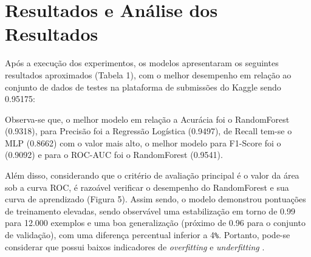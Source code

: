 \documentclass[conference]{IEEEtran}
\begin{document}

\section{Resultados e Análise dos Resultados}
Após a execução dos experimentos, os modelos apresentaram os seguintes resultados aproximados (Tabela 1), com o melhor desempenho em relação ao conjunto de dados de testes na plataforma de submissões do Kaggle sendo 0.95175:

\bigskip

\begin{table}[ht]
\centering
{}
\caption{Métricas de Desempenho por Modelo}
\label{tab:metricas}
\end{table}

\bigskip

\noindent
Observa-se que, o melhor modelo em relação a Acurácia foi o RandomForest (0.9318), para Precisão foi a Regressão Logística (0.9497), de Recall tem-se o MLP (0.8662) com o valor mais alto, o melhor modelo para F1-Score foi o (0.9092) e para o ROC-AUC foi o RandomForest (0.9541). 

Além disso, considerando que o critério de avaliação principal é o valor da área sob a curva ROC, é razoável verificar o desempenho do RandomForest e sua curva de aprendizado (Figura 5). Assim sendo, o modelo demonstrou pontuações de treinamento elevadas, sendo observável uma estabilização em torno de 0.99 para 12.000 exemplos e uma boa generalização (próximo de 0.96 para o conjunto de validação), com uma diferença percentual inferior a 4\verb|%|. Portanto, pode-se considerar que possui baixos indicadores de \emph{overfitting} e \emph{underfitting} \cite{ref:overfit}. 
\end{document}
